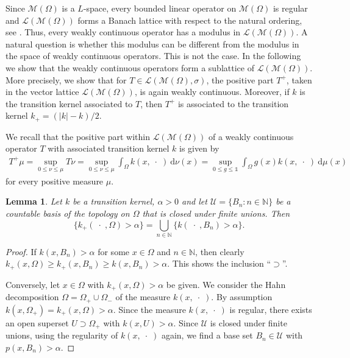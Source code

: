 \documentclass{amsart}
\numberwithin{equation}{section}
\newtheorem{lem}[thm]{Lemma}
\theoremstyle{remark}
\theoremstyle{definition}
\begin{document}
Since $\mathscr{M}(\Omega)$ is a $L$-space, every bounded linear operator on $\mathscr{M}(\Omega)$ is regular and 
$\mathscr{L}(\mathscr{M}(\Omega))$ forms a Banach lattice with respect to the natural ordering, see \cite[Thm IV 1.5]{schaefer1974}.
Thus, every weakly continuous operator has a modulus in $\mathscr{L}(\mathscr{M}(\Omega))$. A natural question is whether this modulus can be different from 
the modulus in the space of weakly continuous operators.
This is not the case. In the following we show that the weakly continuous operators form a sublattice of
$\mathscr{L}(\mathscr{M}(\Omega))$.  More precisely,
we show that for $T\in \mathscr{L}(\mathscr{M}(\Omega),\sigma)$, the positive part $T^+$, taken in the vector lattice $\mathscr{L}(\mathscr{M}(\Omega))$,
is again weakly continuous. Moreover, if $k$ is the transition kernel associated to $T$,
then $T^+$ is associated to the transition kernel $k_+ = (\lvert k\rvert-k)/2$.

We recall that the positive part within $\mathscr{L}(\mathscr{M}(\Omega))$ of a weakly continuous operator $T$ with associated transition kernel $k$ is given by
\begin{align}
\label{eqn:pospart}
 T^+\mu = \sup_{0\leq \nu \leq \mu} T\nu = \sup_{0\leq \nu \leq \mu} \int_\Omega k(x,\;\cdot\;) {\:\mathrm{d}}\nu(x) = \sup_{0\leq g\leq \mathds{1}} \int_\Omega g(x) k(x, \;\cdot\;){\:\mathrm{d}}\mu(x) 
 \end{align}
for every positive measure $\mu$.

\begin{lem}
\label{lem:alphaBn}
	Let $k$ be a transition kernel, $\alpha > 0$ and let $\mathscr{U}=\{ B_n : n\in{\mathds{N}}\}$ be a countable basis of the topology on $\Omega$ that is closed under finite unions.
	Then 
	\[\{ k_+( \;\cdot\;,\Omega) > \alpha \} = \bigcup_{n\in{\mathds{N}}} \{ k(\;\cdot\;,B_n) > \alpha\}.\]
\end{lem}
\begin{proof}
If $k(x,B_n)>\alpha$ for some $x\in \Omega$ and $n\in{\mathds{N}}$, then clearly $k_+(x,\Omega) \geq k_+(x,B_n)\geq k(x,B_n)>\alpha$. This shows the inclusion ``$\supset$''.

Conversely, let $x\in \Omega$ with $k_+(x,\Omega)>\alpha$ be given. We consider the Hahn decomposition 
$\Omega= \Omega_+ \cup \Omega_-$
of the measure $k(x,\;\cdot\;)$. By assumption $k(x,\Omega_+)=k_+(x,\Omega)>\alpha$.
Since the measure $k(x,\;\cdot\;)$ is regular, there exists an open superset $U \supset \Omega_+$ with $k(x,U)>\alpha$.
Since $\mathscr{U}$ is closed under finite unions, using the regularity of $k(x,\;\cdot\;)$ again, we find
a base set $B_n \in \mathscr{U}$ with $p(x,B_n)>\alpha$.
\end{proof}
\end{document}
